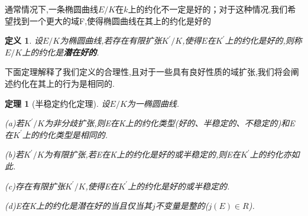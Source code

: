 \documentclass[11pt]{ctexart}
\newtheorem{thm}{定理}[section]
\newtheorem{defi}{定义}[section]
\begin{document}
通常情况下,一条椭圆曲线$E/K$在$k$上的约化不一定是好的；对于这种情况,我们希望找到一个更大的域F,使得椭圆曲线在其上的约化是好的
\begin{defi}设$E/K$为椭圆曲线,若存在有限扩张$K^{\prime}/K$,使得$E$在$K^{\prime}$上的约化是好的,则称$E/K$上的约化是\textbf{潜在好的}.




\end{defi}

下面定理解释了我们定义的合理性,且对于一些具有良好性质的域扩张,我们将会阐述约化在其上的行为是相同的.
\begin{thm}[半稳定约化定理]设$E/K$为一椭圆曲线.

    (a)若$K^{\prime}/K$为非分歧扩张,则E在K上的约化类型(好的、半稳定的、不稳定的)和E在$K^{\prime}$上的约化类型是相同的.

    (b)若$K^{\prime}/K$为有限扩张,若E在K上的约化是好的或半稳定的,则E在$K^{\prime}$上的约化亦如此.

    (c)存在有限扩张$K^{\prime}/K$,使得E在$K^{\prime}$上的约化是好的或半稳定的.

    (d)E在K上的约化是潜在好的当且仅当其$j$不变量是整的($j(E)\in R$).

\end{thm}
\end{document}
